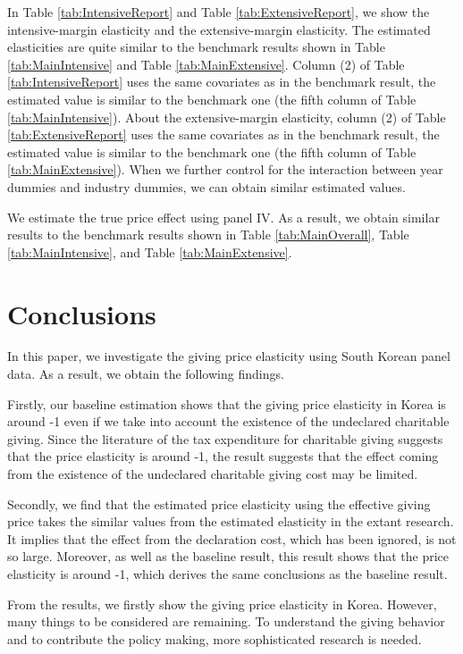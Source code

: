 \documentclass[
  11pt,
  a4paper,
]{article}
\begin{document}
In Table \ref{tab:IntensiveReport} and Table \ref{tab:ExtensiveReport},
we show the intensive-margin elasticity and the extensive-margin elasticity.
The estimated elasticities are quite similar to the benchmark results
shown in Table \ref{tab:MainIntensive} and Table \ref{tab:MainExtensive}.
Column (2) of Table \ref{tab:IntensiveReport} uses the same covariates as in the benchmark result,
the estimated value is similar to the benchmark one (the fifth column of Table \ref{tab:MainIntensive}).
About the extensive-margin elasticity,
column (2) of Table \ref{tab:ExtensiveReport} uses the same covariates as in the benchmark result,
the estimated value is similar to the benchmark one (the fifth column of Table \ref{tab:MainExtensive}).
When we further control for the interaction between year dummies and industry dummies,
we can obtain similar estimated values.

We estimate the true price effect using panel IV.
As a result, we obtain similar results to the benchmark results
shown in Table \ref{tab:MainOverall}, Table \ref{tab:MainIntensive}, and Table \ref{tab:MainExtensive}.

\hypertarget{conclusions}{%
\section{Conclusions}\label{conclusions}}

In this paper, we investigate the giving price elasticity using South Korean panel data. As a result, we obtain the following findings.

Firstly, our baseline estimation shows that the giving price elasticity in Korea is around -1 even if we take into account the existence of the undeclared charitable giving. Since the literature of the tax expenditure for charitable giving suggests that the price elasticity is around -1, the result suggests that the effect coming from the existence of the undeclared charitable giving cost may be limited.

Secondly, we find that the estimated price elasticity using the effective giving price takes the similar values from the estimated elasticity in the extant research. It implies that the effect from the declaration cost, which has been ignored, is not so large. Moreover, as well as the baseline result, this result shows that the price elasticity is around -1, which derives the same conclusions as the baseline result.

From the results, we firstly show the giving price elasticity in Korea. However, many things to be considered are remaining. To understand the giving behavior and to contribute the policy making, more sophisticated research is needed.
\end{document}
